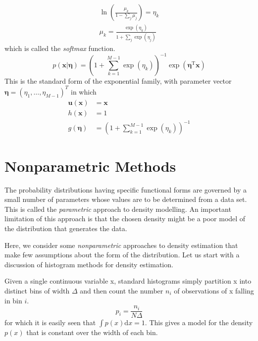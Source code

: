 \documentclass[5p,sort&compress]{elsarticle}
\begin{document}
\begin{equation}
\begin{aligned} \ln \left(\frac{\mu_{k}}{1-\sum_{j} \mu_{j}}\right) =\eta_{k} \\ \mu_{k} =\frac{\exp \left(\eta_{k}\right)}{1+\sum_{j} \exp \left(\eta_{j}\right)} \end{aligned}
\end{equation}
which is called the \textit{softmax} function.
\begin{equation}
p(\mathbf{x} | \boldsymbol{\eta})=\left(1+\sum_{k=1}^{M-1} \exp \left(\eta_{k}\right)\right)^{-1} \exp \left(\boldsymbol{\eta}^{\mathrm{T}} \mathbf{x}\right)   
\end{equation}
This is the standard form of the exponential family, with parameter vector $\boldsymbol{\eta} = (\eta_1, \ldots, \eta_{M-1})^T$ in which
\begin{equation}
\begin{aligned}
\mathbf{u}(\mathbf{x}) &=\mathbf{x} \\ h(\mathbf{x}) &=1 \\ g(\boldsymbol{\eta}) &=\left(1+\sum_{k=1}^{M-1} \exp \left(\eta_{k}\right)\right)^{-1} 
\end{aligned}
\end{equation}

\section{Nonparametric Methods}

The probability distributions having specific functional forms are governed by a small number of parameters whose values are to be determined from a data set. This is called the \textit{parametric} approach to density modelling. An important limitation of this approach is that the chosen density might be a poor model of the distribution that generates the data.

Here, we consider some \textit{nonparametric} approaches to density estimation that make few assumptions about the form of the distribution. Let us start with a discussion of histogram methods for density estimation. 

Given a single continuous variable x, standard histograms simply partition x into distinct bins of width $\Delta$ and then count the number $n_i$ of observations of x falling in bin $i$. 
\begin{equation}
p_{i}=\frac{n_{i}}{N \Delta}
\end{equation}
for which it is easily seen that $\int p(x) \mathrm{d} x=1$. This gives a model for the density $p(x)$ that is constant over the width of each bin.
\end{document}
